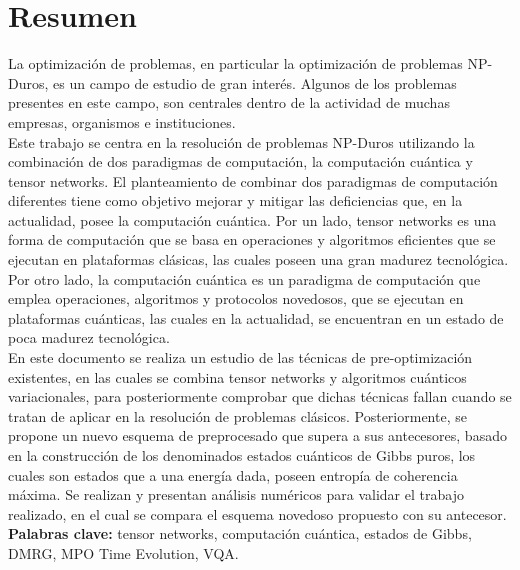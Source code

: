 \chapter{Resumen}

La optimización de problemas, en particular la optimización de problemas NP-Duros, es un campo de estudio de gran interés. Algunos de los problemas presentes en este campo, son centrales dentro de la actividad de muchas empresas, organismos e instituciones. \\

Este trabajo se centra en la resolución de problemas NP-Duros utilizando la combinación de dos paradigmas de computación, la computación cuántica y tensor networks. El planteamiento de combinar dos paradigmas de computación diferentes tiene como objetivo mejorar y mitigar las deficiencias que, en la actualidad, posee la computación cuántica. Por un lado, tensor networks es una forma de computación que se basa en operaciones y algoritmos eficientes que se ejecutan en plataformas clásicas, las cuales poseen una gran madurez tecnológica. Por otro lado, la computación cuántica es un paradigma de computación que emplea operaciones, algoritmos y protocolos novedosos, que se ejecutan en plataformas cuánticas, las cuales en la actualidad, se encuentran en un estado de poca madurez tecnológica. \\

En este documento se realiza un estudio de las técnicas de pre-optimización existentes, en las cuales se combina tensor networks y algoritmos cuánticos variacionales, para posteriormente comprobar que dichas técnicas fallan cuando se tratan de aplicar en la resolución de problemas clásicos. Posteriormente, se propone un nuevo esquema de preprocesado que supera a sus antecesores, basado en la construcción de los denominados estados cuánticos de Gibbs puros, los cuales son estados que a una energía dada, poseen entropía de coherencia máxima. Se realizan y presentan análisis numéricos para validar el trabajo realizado, en el cual se compara el esquema novedoso propuesto con su antecesor. \\

{\bf Palabras clave:} tensor networks, computación  cuántica, estados de Gibbs, DMRG, MPO Time Evolution, VQA.